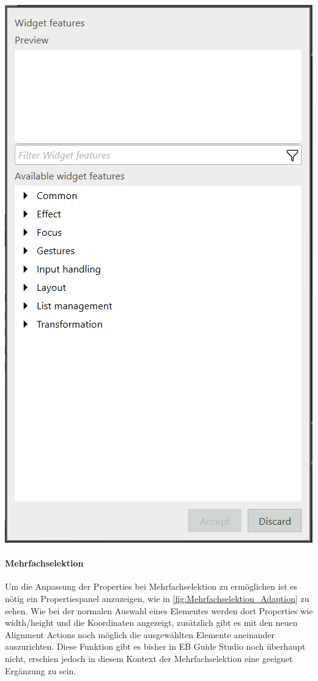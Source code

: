 \begin{center}
  \includegraphics[scale=0.5]{figures/WidgetFeatureProperty_Adaption.png}
  \label{fig:FeatureProperty_Adaption}
\end{center}


\paragraph{Mehrfachselektion}
Um die Anpassung der Properties bei Mehrfachselektion zu ermöglichen ist es nötig ein Propertiespanel anzuzeigen, wie in \cref{fig:Mehrfachselektion_Adaption} zu sehen.
Wie bei der normalen Auswahl eines Elementes werden dort Properties wie width/height und die Koordinaten angezeigt, zusätzlich gibt es mit den neuen Alignment Actions noch möglich die ausgewählten Elemente aneinander auszurichten.
Diese Funktion gibt es bisher in EB Guide Studio noch überhaupt nicht, erschien jedoch in diesem Kontext der Mehrfachselektion eine geeignet Ergänzung zu sein.

